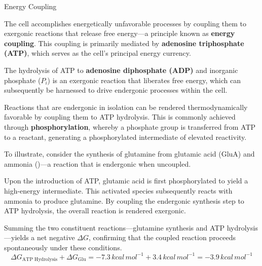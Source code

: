 \documentclass[10pt]{article}
\begin{document}
    \begin{core}{Energy Coupling}

      The cell accomplishes energetically unfavorable processes by coupling them to exergonic reactions that release free energy---a principle known as \textbf{energy coupling}. This coupling is primarily mediated by \textbf{adenosine triphosphate (ATP)}, which serves as the cell's principal energy currency.


      The hydrolysis of ATP to \textbf{adenosine diphosphate (ADP)} and inorganic phosphate ($P_i$) is an exergonic reaction that liberates free energy, which can subsequently be harnessed to drive endergonic processes within the cell.


      Reactions that are endergonic in isolation can be rendered thermodynamically favorable by coupling them to ATP hydrolysis. This is commonly achieved through \textbf{phosphorylation}, whereby a phosphate group is transferred from ATP to a reactant, generating a phosphorylated intermediate of elevated reactivity.

      To illustrate, consider the synthesis of glutamine from glutamic acid (GluA) and ammonia ()---a reaction that is endergonic when uncoupled.


      Upon the introduction of ATP, glutamic acid is first phosphorylated to yield a high-energy intermediate. This activated species subsequently reacts with ammonia to produce glutamine. By coupling the endergonic synthesis step to ATP hydrolysis, the overall reaction is rendered exergonic.


      Summing the two constituent reactions---glutamine synthesis and ATP hydrolysis---yields a net negative $\Delta G$, confirming that the coupled reaction proceeds spontaneously under these conditions.
      \[
        ΔG_{\text{ATP Hydrolysis}} + ΔG_{\text{Glu}} = -7.3 \, kcal \, mol^{-1} + 3.4 \, kcal \, mol^{-1} = -3.9 \, kcal \, mol^{-1}
      \]

    \end{core}
\end{document}

